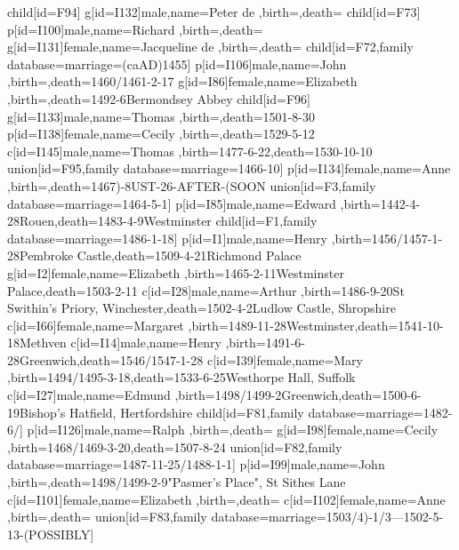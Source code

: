 child[id=F94]{
	g[id=I132]{male,name={Peter de },birth={}{},death={}{}}
	child[id=F73]{
		p[id=I100]{male,name={Richard },birth={}{},death={}{}}
		g[id=I131]{female,name={Jacqueline de },birth={}{},death={}{}}
		child[id=F72,family database={marriage={(caAD)1455}{}}]{
			p[id=I106]{male,name={John },birth={}{},death={1460/1461-2-17}{}}
			g[id=I86]{female,name={Elizabeth },birth={}{},death={1492-6}{Bermondsey Abbey}}
			child[id=F96]{
				g[id=I133]{male,name={Thomas },birth={}{},death={1501-8-30}{}}
				p[id=I138]{female,name={Cecily },birth={}{},death={1529-5-12}{}}
				c[id=I145]{male,name={Thomas },birth={1477-6-22}{},death={1530-10-10}{}}
				union[id=F95,family database={marriage={1466-10}{}}]{
					p[id=I134]{female,name={Anne },birth={}{},death={1467)-8UST-26-AFTER-(SOON}{}}
				}
			}
			union[id=F3,family database={marriage={1464-5-1}{}}]{
				p[id=I85]{male,name={Edward },birth={1442-4-28}{Rouen},death={1483-4-9}{Westminster}}
				child[id=F1,family database={marriage={1486-1-18}{}}]{
					p[id=I1]{male,name={Henry },birth={1456/1457-1-28}{Pembroke Castle},death={1509-4-21}{Richmond Palace}}
					g[id=I2]{female,name={Elizabeth },birth={1465-2-11}{Westminster Palace},death={1503-2-11}{}}
					c[id=I28]{male,name={Arthur },birth={1486-9-20}{St Swithin's Priory, Winchester},death={1502-4-2}{Ludlow Castle, Shropshire}}
					c[id=I66]{female,name={Margaret },birth={1489-11-28}{Westminster},death={1541-10-18}{Methven}}
					c[id=I14]{male,name={Henry },birth={1491-6-28}{Greenwich},death={1546/1547-1-28}{}}
					c[id=I39]{female,name={Mary },birth={1494/1495-3-18}{},death={1533-6-25}{Westhorpe Hall, Suffolk}}
					c[id=I27]{male,name={Edmund },birth={1498/1499-2}{Greenwich},death={1500-6-19}{Bishop's Hatfield, Hertfordshire}}
				}
				child[id=F81,family database={marriage={1482-6/}{}}]{
					p[id=I126]{male,name={Ralph },birth={}{},death={}{}}
					g[id=I98]{female,name={Cecily },birth={1468/1469-3-20}{},death={1507-8-24}{}}
					union[id=F82,family database={marriage={1487-11-25/1488-1-1}{}}]{
						p[id=I99]{male,name={John },birth={}{},death={1498/1499-2-9}{"Pasmer's Place", St Sithes Lane}}
						c[id=I101]{female,name={Elizabeth },birth={}{},death={}{}}
						c[id=I102]{female,name={Anne },birth={}{},death={}{}}
					}
					union[id=F83,family database={marriage={1503/4)-1/3---1502-5-13-(POSSIBLY}{}}]{
}}}}}}
